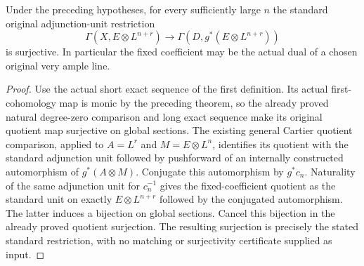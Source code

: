 \begin{theorem}
\label{thm:seshadri-fixed-coefficient-cut-eventual-standard-restriction}
\leanok
{}
Under the preceding hypotheses, for every sufficiently large $n$ the
standard original adjunction-unit restriction
\[
 \Gamma(X,E\otimes L^{n+r})\longrightarrow
 \Gamma(D,g^*(E\otimes L^{n+r}))
\]
is surjective. In particular the fixed coefficient may be the actual
dual of a chosen original very ample line.
\end{theorem}
\begin{proof}
Use the actual short exact sequence of the first definition.
Its actual first-cohomology map is monic by the preceding theorem, so
the already proved natural degree-zero comparison and long exact
sequence make its original quotient map surjective on global sections.
The existing general Cartier quotient comparison, applied to
$A=L^r$ and $M=E\otimes L^n$, identifies its quotient with the standard
adjunction unit followed by pushforward of an internally constructed
automorphism of $g^*(A\otimes M)$. Conjugate this automorphism by
$g^*c_n$. Naturality of the same adjunction unit for $c_n^{-1}$ gives
the fixed-coefficient quotient as the standard unit on exactly
$E\otimes L^{n+r}$ followed by the conjugated automorphism.
The latter induces a bijection on global sections. Cancel this
bijection in the already proved quotient surjection. The resulting
surjection is precisely the stated standard restriction, with no
matching or surjectivity certificate supplied as input.
\end{proof}
